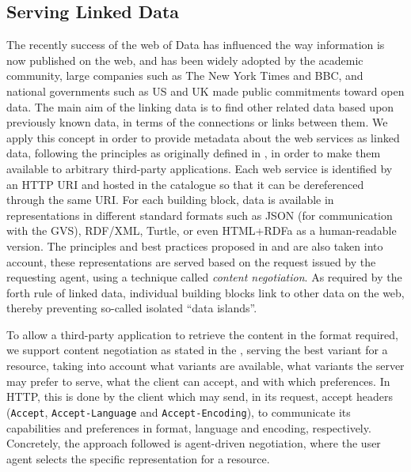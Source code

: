 
\subsection{Serving Linked Data} %
\label{sub:linked_data}

The recently success of the web of Data has influenced the way information is now published on the web, and has been widely adopted by the academic community, large companies such as The New York Times and BBC, and national governments such as US and UK made public commitments toward open data. The main aim of the linking data is to find other related data based upon previously known data, in terms of the connections or links between them. We apply this concept in order to provide metadata about the web services as linked data, following the principles as originally defined in \cite{bizer_ijswis2009}, in order to make them available to arbitrary third-party applications. Each web service is identified by an HTTP URI and hosted in the catalogue so that it can be dereferenced through the same URI. For each building block, data is available in representations in different standard formats such as JSON (for communication with the GVS), RDF/XML, Turtle, or even HTML+RDFa as a human-readable version. The principles and best practices proposed in \cite{berrueta2008} and \cite{sauermann2008cool_uris} are also taken into account, these representations are served based on the request issued by the requesting agent, using a technique called \emph{content negotiation}. As required by the forth rule of linked data, individual building blocks link to other data on the web, thereby preventing so-called isolated ``data islands''.

To allow a third-party application to retrieve the content in the format required, we support content negotiation as stated in the \cite{http1.1}, serving the best variant for a resource, taking into account what variants are available, what variants the server may prefer to serve, what the client can accept, and with which preferences. In HTTP, this is done by the client which may send, in its request, accept headers (\texttt{Accept}, \texttt{Accept-Language} and \texttt{Accept-Encoding}), to communicate its capabilities and preferences in format, language and encoding, respectively. Concretely, the approach followed is agent-driven negotiation, where the user agent selects the specific representation for a resource.

